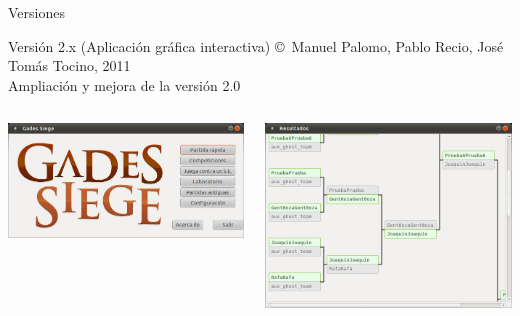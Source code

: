 \documentclass[smaller,spanish,xcolor=svgnames]{beamer}
\begin{document}
\begin{frame}{Versiones}
  \begin{block}{Versión 2.x (Aplicación gráfica interactiva)}
      \copyright \, Manuel Palomo, Pablo Recio, José Tomás Tocino, 2011 \\
      Ampliación y mejora de la versión 2.0
  \end{block}

  \begin{columns}[c]
    \begin{center}
      \includegraphics[width=\textwidth]{img/version_51}
    \end{center}

    \begin{center}
      \includegraphics[width=\textwidth]{img/version_52}
    \end{center}

  \end{columns}  
\end{frame}
\end{document}
